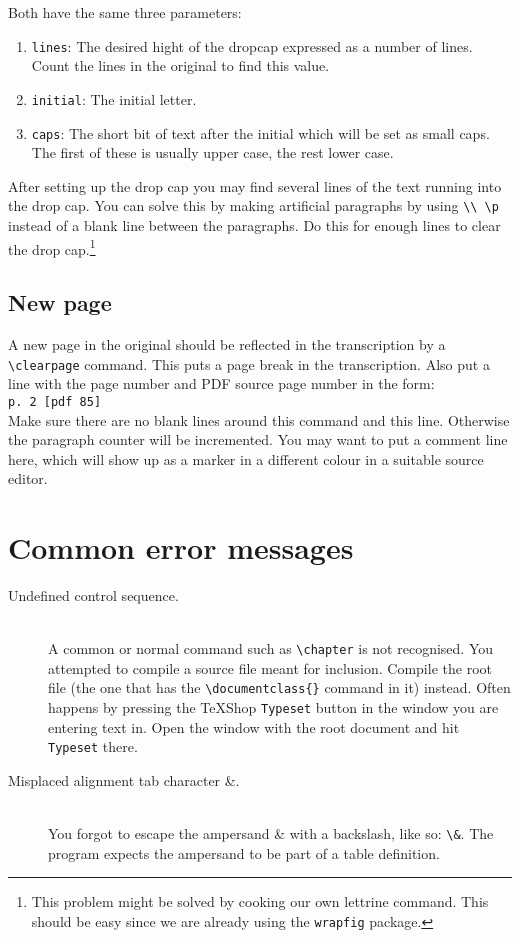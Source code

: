 \documentclass{report}
\begin{document}
Both have the same three parameters:
\begin{enumerate}
\item \texttt{lines}: The desired hight of the dropcap expressed as a number of lines. Count the lines in the original to find this value.
\item \texttt{initial}: The initial letter.
\item \texttt{caps}: The short bit of text after the initial which will be set as small caps. The first of these is usually upper case, the rest lower case.
\end{enumerate}
After setting up the drop cap you may find several lines of the text running
into the drop cap. You can solve this by making artificial paragraphs by
using \verb;\\ \p; instead of a blank line between the paragraphs. Do this
for enough lines to clear the drop cap.\footnote{This problem might be solved
by cooking our own lettrine command. This should be easy since we are already
using the \texttt{wrapfig} package.}

%
\subsection{New page}
A new page in the original should be reflected in the transcription by a
\verb;\clearpage; command. This puts a page break in the transcription.
Also put a line with the page number and PDF source page number in the form:\\
\indent\texttt{p. 2 [pdf 85]}\\
Make sure there are no blank lines around this command and this line. Otherwise
the paragraph counter will be incremented. You may want to put a comment line
here, which will show up as a marker in a different colour in a suitable
source editor.

\section{Common error messages}
\begin{description}
\item[Undefined control sequence.] \hfill \\
A common or normal command such as \verb;\chapter;
is not recognised. You attempted to compile a source file meant for inclusion. Compile the root file (the one that has the \verb;\documentclass{}; command in it) instead. Often happens by pressing the TeXShop \texttt{Typeset} button in the window you are entering text in. Open the window with the root document and hit \texttt{Typeset} there.

\item[Misplaced alignment tab character \&.] \hfill \\
You forgot to escape the ampersand \& with a backslash, like so: \verb;\&;. The program expects the ampersand to be part of a table definition.
\end{description}
\end{document}
